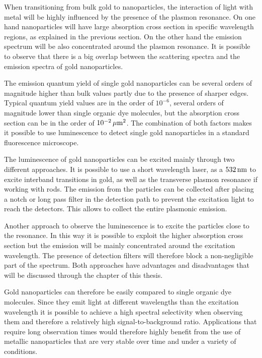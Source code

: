 When transitioning from bulk gold to nanoparticles, the interaction of light
with metal will be highly influenced by the presence of the plasmon resonance.
On one hand nanoparticles will have large absorption cross section in specific
wavelength regions, as explained in the previous section. On the other hand the
emission spectrum will be also concentrated around the plasmon resonance. It is
possible to observe that there is a big overlap between the scattering spectra
and the emission spectra of gold nanoparticles.

The emission quantum yield of single gold nanoparticles can be several orders of
magnitude higher than bulk values partly due to the presence of sharper edges.
Typical quantum yield values are in the order of $10^{-6}$, several orders of
magnitude lower than single organic dye molecules, but the absorption cross
section can be in the order of $10^{-2}\,\mu\textrm{m}^2$. The combination of both factors
makes it possible to use luminescence to detect single gold nanoparticles in a
standard fluorescence microscope. 

The luminescence of gold nanoparticles can be excited mainly through two
different approaches. It is possible to use a short wavelength laser, as a
$532\,\textrm{nm}$ to excite interband transitions in gold, as well as the transverse
plasmon resonance if working with rods. The emission from the particles can be
collected after placing a notch or long pass filter in the detection path to
prevent the excitation light to reach the detectors. This allows to collect the
entire plasmonic emission. 

Another approach to observe the luminescence is to excite the particles close to
the resonance. In this way it is possible to exploit the higher absorption cross
section but the emission will be mainly concentrated around the excitation
wavelength. The presence of detection filters will therefore block a
non-negligible part of the spectrum. Both approaches have advantages and
disadvantages that will be discussed through the chapter of this thesis. 

Gold nanoparticles can therefore be easily compared to single organic dye
molecules. Since they emit light at different wavelengths than the excitation
wavelength it is possible to achieve a high spectral selectivity when observing
them and therefore a relatively high signal-to-background ratio. Applications
that require long observation times would therefore highly benefit from the use
of metallic nanoparticles that are very stable over time and under a variety of
conditions. 

